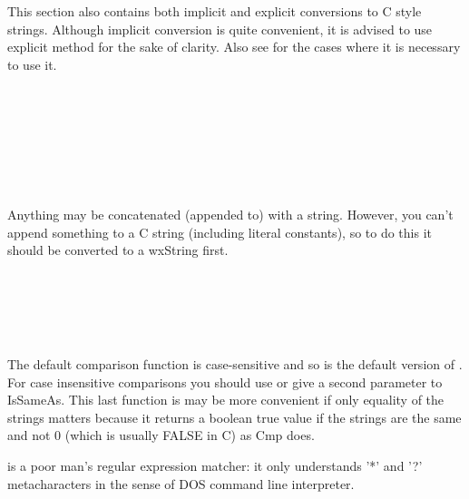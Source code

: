 This section also contains both implicit and explicit conversions to C style
strings. Although implicit conversion is quite convenient, it is advised to use
explicit  method for the sake of clarity. Also
see  for the cases where it is necessary to
use it.

\\
\\
\\
\\
\\
\\


Anything may be concatenated (appended to) with a string. However, you can't
append something to a C string (including literal constants), so to do this it
should be converted to a wxString first.

\\
\\
\\
\\


The default comparison function  is case-sensitive and
so is the default version of . For case
insensitive comparisons you should use  or
give a second parameter to IsSameAs. This last function is may be more
convenient if only equality of the strings matters because it returns a boolean
true value if the strings are the same and not 0 (which is usually FALSE in C)
as Cmp does.

 is a poor man's regular expression matcher:
it only understands '*' and '?' metacharacters in the sense of DOS command line
interpreter.

\\
\\
\\

